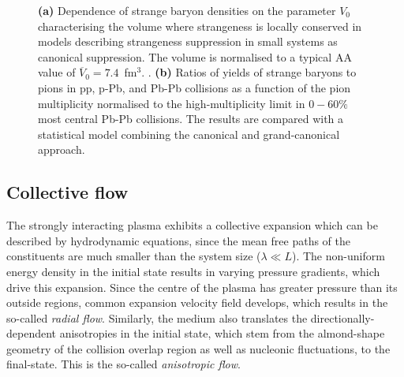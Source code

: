 \begin{figure}[H]
\hspace{1em}
\caption{\textbf{(a)} Dependence of strange baryon densities on the parameter $V_0$ characterising the volume where strangeness is locally conserved in models describing strangeness suppression in small systems as canonical suppression. The volume is normalised to a typical AA value of $\overline{V}_0=7.4$~fm$^{3}$. \cite{hamiehCanonicalDescriptionStrangeness2000}. \textbf{(b)} Ratios of yields of strange baryons to pions in pp, p-Pb, and Pb-Pb collisions as a function of the pion multiplicity normalised to the high-multiplicity limit in $0-60\%$ most central Pb-Pb collisions. The results are compared with a statistical model combining the canonical and grand-canonical approach. \cite{alicecollaborationMultistrangeBaryonProduction2016, wheatonTHERMUSThermalModel2009}}
\label{fig:colls:strangeness}
\end{figure}


\subsection{Collective flow}

The strongly interacting plasma exhibits a collective expansion which can be described by hydrodynamic equations, since the mean free paths of the constituents are much smaller than the system size ($\lambda \ll L$). The non-uniform energy density in the initial state results in varying pressure gradients, which drive this expansion. Since the centre of the plasma has greater pressure than its outside regions, common expansion velocity field develops, which results in the so-called \textit{radial flow}. Similarly, the medium also translates the directionally-dependent anisotropies in the initial state, which stem from the almond-shape geometry of the collision overlap region as well as nucleonic fluctuations, to the final-state. This is the so-called \textit{anisotropic flow}.


